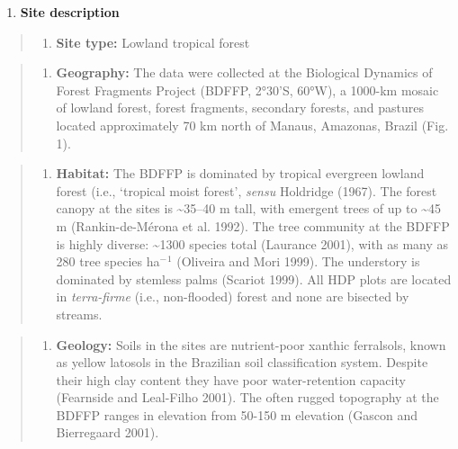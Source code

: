 \documentclass[
  12pt,
  man, donotrepeattitle,floatsintext]{apa6}
\providecommand{\tightlist}{%
  \setlength{\itemsep}{0pt}\setlength{\parskip}{0pt}}
\begin{document}
\begin{enumerate}
\def\labelenumi{\arabic{enumi}.}
\tightlist
\item
  \textbf{Site description}
\end{enumerate}

\begin{quote}
\begin{enumerate}
\def\labelenumi{\alph{enumi}.}
\tightlist
\item
  \textbf{Site type:} Lowland tropical forest
\end{enumerate}
\end{quote}

\begin{quote}
\begin{enumerate}
\def\labelenumi{\alph{enumi}.}
\setcounter{enumi}{1}
\tightlist
\item
  \textbf{Geography:} The data were collected at the Biological Dynamics of Forest Fragments Project (BDFFP, 2°30'S, 60°W), a 1000-km mosaic of lowland forest, forest fragments, secondary forests, and pastures located approximately 70 km north of Manaus, Amazonas, Brazil (Fig. 1).
\end{enumerate}
\end{quote}

\begin{quote}
\begin{enumerate}
\def\labelenumi{\alph{enumi}.}
\setcounter{enumi}{2}
\tightlist
\item
  \textbf{Habitat:} The BDFFP is dominated by tropical evergreen lowland forest (i.e., `tropical moist forest', \emph{sensu} Holdridge (1967). The forest canopy at the sites is \textasciitilde35--40 m tall, with emergent trees of up to \textasciitilde45 m (Rankin-de-Mérona et al. 1992). The tree community at the BDFFP is highly diverse: \textasciitilde1300 species total (Laurance 2001), with as many as 280 tree species ha\(^-\)\(^1\) (Oliveira and Mori 1999). The understory is dominated by stemless palms (Scariot 1999). All HDP plots are located in \emph{terra-firme} (i.e., non-flooded) forest and none are bisected by streams.
\end{enumerate}
\end{quote}

\begin{quote}
\begin{enumerate}
\def\labelenumi{\alph{enumi}.}
\setcounter{enumi}{3}
\tightlist
\item
  \textbf{Geology:} Soils in the sites are nutrient-poor xanthic ferralsols, known as yellow latosols in the Brazilian soil classification system. Despite their high clay content they have poor water-retention capacity (Fearnside and Leal-Filho 2001). The often rugged topography at the BDFFP ranges in elevation from 50-150 m elevation (Gascon and Bierregaard 2001).
\end{enumerate}
\end{quote}
\end{document}
